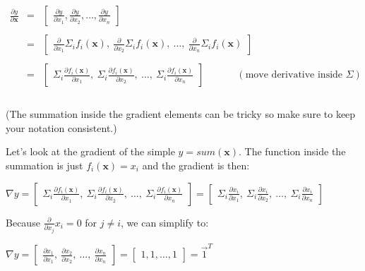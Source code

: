 \documentclass[11pt]{article}
\begin{document}
$
\begin{array}{lcl}
\frac{\partial y}{\partial \mathbf{x}} & = & \begin{bmatrix} \frac{\partial y}{\partial x_1}, \frac{\partial y}{\partial x_2}, \ldots, \frac{\partial y}{\partial x_n} \end{bmatrix}\\\\
 & = & \begin{bmatrix} \frac{\partial}{\partial x_1} \Sigma_i f_i(\mathbf{x}),~ \frac{\partial}{\partial x_2} \Sigma_i f_i(\mathbf{x}),~ \ldots,~ \frac{\partial}{\partial x_n} \Sigma_i  f_i(\mathbf{x}) \end{bmatrix} \\\\
 & = & \begin{bmatrix} \Sigma_i \frac{\partial f_i(\mathbf{x})}{\partial x_1},~ \Sigma_i \frac{\partial f_i(\mathbf{x})}{\partial x_2},~ \ldots,~ \Sigma_i \frac{\partial f_i(\mathbf{x})}{\partial x_n}  \end{bmatrix}~~~~~~~~~~~~~~~(\text{move derivative inside }\Sigma)\\\\
\end{array}
$

(The summation inside the gradient elements can be tricky so make sure to keep your notation consistent.)

Let's look at the gradient of the simple $y = sum(\mathbf{x})$. The function inside the summation is just $f_i(\mathbf{x}) = x_i$ and the gradient is then:

$\nabla y = \begin{bmatrix} \Sigma_i \frac{\partial f_i(\mathbf{x})}{\partial x_1},~ \Sigma_i \frac{\partial f_i(\mathbf{x})}{\partial x_2},~ \ldots,~ \Sigma_i \frac{\partial f_i(\mathbf{x})}{\partial x_n}  \end{bmatrix} = \begin{bmatrix} \Sigma_i \frac{\partial x_i}{\partial x_1},~ \Sigma_i \frac{\partial x_i}{\partial x_2},~ \ldots,~ \Sigma_i \frac{\partial x_i}{\partial x_n}  \end{bmatrix}$

Because $\frac{\partial}{\partial x_j} x_i = 0$ for $j \neq i$, we can simplify to:

$\nabla y = \begin{bmatrix} \frac{\partial x_1}{\partial x_1},~ \frac{\partial x_2}{\partial x_2},~ \ldots,~ \frac{\partial x_n}{\partial x_n}  \end{bmatrix} = \begin{bmatrix}1, 1, \ldots, 1\end{bmatrix} = \vec{1}^T$
\end{document}
